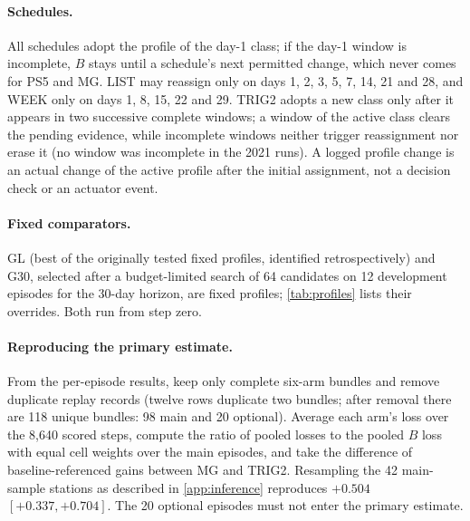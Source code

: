\paragraph{Schedules.} All schedules adopt the profile of the day-1 class; if the day-1 window is incomplete, $B$ stays until a
schedule's next permitted change, which never comes for PS5 and MG. LIST may reassign only on days 1, 2, 3, 5, 7, 14, 21 and 28, and WEEK only on days 1, 8, 15, 22 and 29. TRIG2 adopts a
new class only after it appears in two successive complete windows; a window of the active class clears the pending
evidence, while incomplete windows neither trigger reassignment nor erase it (no window was incomplete in the 2021 runs). A logged profile change is an actual change of the active profile after the initial assignment, not a
decision check or an actuator event.

\paragraph{Fixed comparators.}
GL (best of the originally tested fixed profiles, identified retrospectively) and G30, selected after a budget-limited search
of 64 candidates on 12 development episodes for the 30-day horizon, are fixed profiles; \cref{tab:profiles} lists their
overrides. Both run from step zero.

\paragraph{Reproducing the primary estimate.}
From the per-episode results, keep only complete six-arm bundles and remove duplicate replay records (twelve rows
duplicate two bundles; after removal there are 118 unique bundles: 98 main and 20 optional). Average each arm's loss
over the 8,640 scored steps, compute the ratio of pooled losses to the pooled $B$ loss with equal cell weights over the main episodes,
and take the difference of baseline-referenced gains between MG and TRIG2. Resampling the 42 main-sample stations as
described in \cref{app:inference} reproduces $+0.504$\pp{} $[+0.337, +0.704]$. The 20 optional episodes must not enter
the primary estimate.

